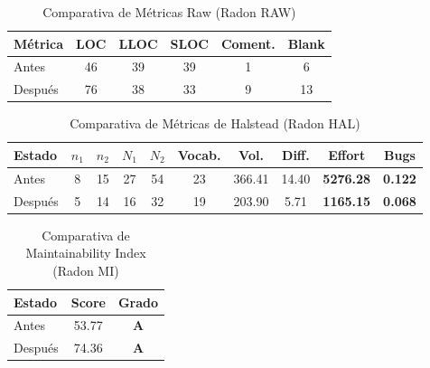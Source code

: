 \documentclass{article}
\newcommand{\good}[1]{\textbf{\textcolor{metGood}{#1}}}
\newcommand{\medium}[1]{\textbf{\textcolor{metMedium}{#1}}}
\newcommand{\bad}[1]{\textbf{\textcolor{metBad}{#1}}}
\begin{document}
\begin{table}[H]
    \centering
    \small
    \begin{tabular}{lccccc}
        \toprule
        \textbf{Métrica} & \textbf{LOC} & \textbf{LLOC} & \textbf{SLOC} & \textbf{Coment.} & \textbf{Blank} \\
        \midrule
        Antes            & 46           & 39            & 39            & 1                & 6              \\
        Después          & 76           & 38            & 33            & 9                & 13             \\
        \bottomrule
    \end{tabular}
    \caption{Comparativa de Métricas Raw (Radon RAW)}
    \label{tab:raw_comparativa}
\end{table}

\begin{table}[H]
    \centering
    \small
    \setlength{\tabcolsep}{4pt}
    \begin{tabular}{lcccccccc c}
        \toprule
        \textbf{Estado} & \textbf{$n_1$} & \textbf{$n_2$} & \textbf{$N_1$} & \textbf{$N_2$} & \textbf{Vocab.} & \textbf{Vol.} & \textbf{Diff.} & \textbf{Effort}  & \textbf{Bugs}  \\
        \midrule
        Antes           & 8              & 15             & 27             & 54             & 23              & 366.41        & 14.40          & \bad{5276.28}    & \medium{0.122} \\
        Después         & 5              & 14             & 16             & 32             & 19              & 203.90        & 5.71           & \medium{1165.15} & \good{0.068}   \\
        \bottomrule
    \end{tabular}
    \caption{Comparativa de Métricas de Halstead (Radon HAL)}
    \label{tab:hal_comparativa}
\end{table}

\begin{table}[H]
    \centering
    \small
    \begin{tabular}{lcc}
        \toprule
        \textbf{Estado} & \textbf{Score} & \textbf{Grado} \\
        \midrule
        Antes           & 53.77          & \good{A}       \\
        Después         & 74.36          & \good{A}       \\
        \bottomrule
    \end{tabular}
    \caption{Comparativa de Maintainability Index (Radon MI)}
    \label{tab:mi_comparativa}
\end{table}
\end{document}
